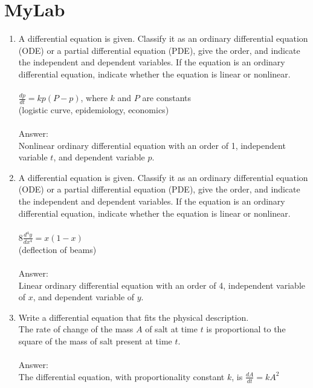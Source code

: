\documentclass[12pt]{report}
\begin{document}
		\section*{MyLab}
			\begin{enumerate}
				\item A differential equation is given. Classify it as an ordinary differential equation (ODE) or a partial differential equation (PDE), give the order, and indicate the independent and dependent variables. If the equation is an ordinary differential equation, indicate whether the equation is linear or nonlinear.\\\\
				$\frac{dp}{dt}=kp(P-p)$, where $k$ and $P$ are constants\\
				(logistic curve, epidemiology, economics)\\\\
				Answer:\\
				Nonlinear ordinary differential equation with an order of 1, independent variable $t$, and dependent variable $p$.\\
				
				\item A differential equation is given. Classify it as an ordinary differential equation (ODE) or a partial differential equation (PDE), give the order, and indicate the independent and dependent variables. If the equation is an ordinary differential equation, indicate whether the equation is linear or nonlinear.\\\\
				$8\frac{d^4y}{dx^4}=x(1-x)$\\
				(deflection of beams)\\\\
				Answer:\\
				Linear ordinary differential equation with an order of 4, independent variable of $x$, and dependent variable of $y$.\\
				
				\item Write a differential equation that fits the physical description.\\
				The rate of change of the mass $A$ of salt at time $t$ is proportional to the square of the mass of salt present at time $t$.\\\\
				Answer:\\
				The differential equation, with proportionality constant $k$, is $\frac{dA}{dt}=kA^2$\\
				

\end{enumerate}
\end{document}
